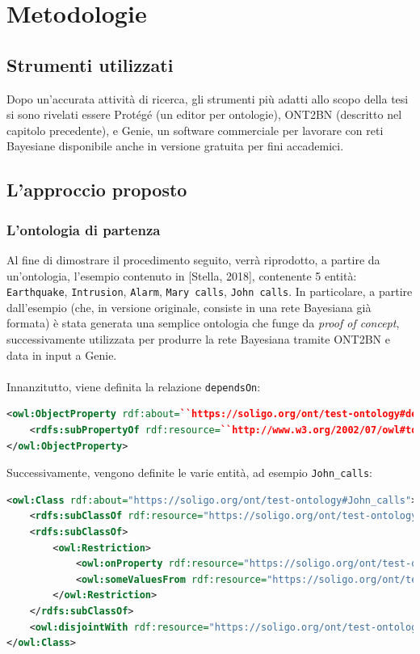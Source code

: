 \chapter{Metodologie}
\section{Strumenti utilizzati}
Dopo un'accurata attività di ricerca, gli strumenti più adatti allo scopo della tesi si sono rivelati essere Protégé\cite{protege} (un editor per ontologie), ONT2BN\cite{kalet2017} (descritto nel capitolo precedente), e Genie\cite{genie}, un software commerciale per lavorare con reti Bayesiane disponibile anche in versione gratuita per fini accademici.

\section{L'approccio proposto}
\subsection{L'ontologia di partenza}
Al fine di dimostrare il procedimento seguito, verrà riprodotto, a partire da un'ontologia, l'esempio contenuto in [Stella, 2018]\cite{stella2018}, contenente 5 entità: \texttt{Earthquake}, \texttt{Intrusion}, \texttt{Alarm}, \texttt{Mary calls}, \texttt{John calls}. In particolare, a partire dall'esempio (che, in versione originale, consiste in una rete Bayesiana già formata) è stata generata una semplice ontologia che funge da \textit{proof of concept}, successivamente utilizzata per produrre la rete Bayesiana tramite ONT2BN e data in input a Genie.\\
\\Innanzitutto, viene definita la relazione \texttt{dependsOn}:
\begin{lstlisting}[language=xml]
<owl:ObjectProperty rdf:about=``https://soligo.org/ont/test-ontology#dependsOn''>
	<rdfs:subPropertyOf rdf:resource=``http://www.w3.org/2002/07/owl#topObjectProperty''/>
</owl:ObjectProperty>
\end{lstlisting}

\clearpage Successivamente, vengono definite le varie entità, ad esempio \texttt{John\_calls}:
\begin{lstlisting}[language=xml]
<owl:Class rdf:about="https://soligo.org/ont/test-ontology#John_calls">
	<rdfs:subClassOf rdf:resource="https://soligo.org/ont/test-ontology#Action"/>
	<rdfs:subClassOf>
		<owl:Restriction>
			<owl:onProperty rdf:resource="https://soligo.org/ont/test-ontology#dependsOn"/>
			<owl:someValuesFrom rdf:resource="https://soligo.org/ont/test-ontology#Alarm"/>
		</owl:Restriction>
	</rdfs:subClassOf>
	<owl:disjointWith rdf:resource="https://soligo.org/ont/test-ontology#Mary_calls"/>
</owl:Class>
\end{lstlisting}


